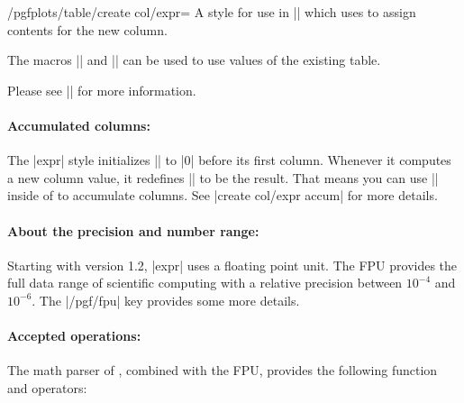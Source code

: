 \begin{stylekey}{/pgfplots/table/create col/expr=}
    A style for use in |\pgfplotstablecreatecol| which uses  to assign contents for the new column.
\begin{codeexample}[pre={\begin{lateximage}},post={\end{lateximage}}]

\end{codeexample}
    The macros |\thisrow| and |\nextrow| can be
    used to use values of the existing table.

    Please see |\pgfplotstablecreatecol| for more information.


    \paragraph{Accumulated columns:}

    The |expr| style initializes |\pgfmathaccuma| to |0| before its first
    column. Whenever it computes a new column value, it redefines
    |\pgfmathaccuma| to be the result. That means you can use |\pgfmathaccuma|
    inside of  to accumulate columns. See
    |create col/expr accum| for more details.


    \paragraph{About the precision and number range:}

    Starting with version 1.2, |expr| uses a floating point unit. The FPU
    provides the full data range of scientific computing with a relative
    precision between $10^{-4}$ and $10^{-6}$. The |/pgf/fpu| key provides some
    more details.


    \paragraph{Accepted operations:}

    The math parser of \PGF, combined with the FPU, provides the following
    function and operators:


\end{stylekey}

